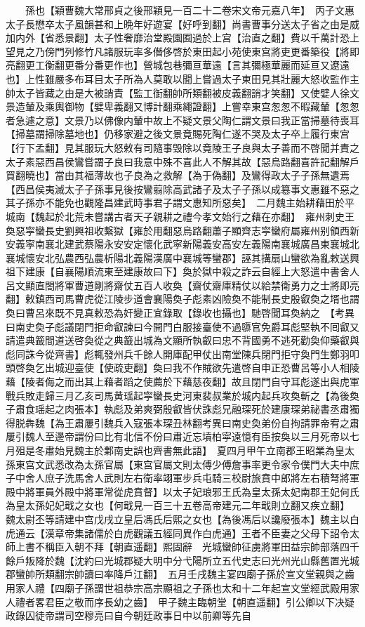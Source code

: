 　　孫也【穎曹魏大常邢貞之後邢穎見一百二十二卷宋文帝元嘉八年】　丙子文惠太子長懋卒太子風韻甚和上晩年好遊宴【好呼到翻】尚書曹事分送太子省之由是威加内外【省悉景翻】太子性奢靡治堂殿園囿過於上宫【治直之翻】費以千萬計恐上望見之乃傍門列修竹凡諸服玩率多僭侈啓於東田起小苑使東宫將吏更番築役【將即亮翻更工衡翻更番分番更作也】營城包巷彌亘華遠【言其彌極華麗而延亘又遼遠也】上性雖嚴多布耳目太子所為人莫敢以聞上嘗過太子東田見其壯麗大怒收監作主帥太子皆藏之由是大被誚責【監工衘翻帥所類翻被皮義翻誚才笑翻】又使嬖人徐文景造輦及乘輿御物【嬖卑義翻又博計翻乘繩證翻】上嘗幸東宫怱怱不暇藏輦【怱怱者急遽之意】文景乃以佛像内輦中故上不疑文景父陶仁謂文景曰我正當掃墓待喪耳【掃墓謂掃除墓地也】仍移家避之後文景竟賜死陶仁遂不哭及太子卒上履行東宫【行下孟翻】見其服玩大怒敕有司隨事毁除以竟陵王子良與太子善而不啓聞并責之太子素惡西昌侯鸞嘗謂子良曰我意中殊不喜此人不解其故【惡烏路翻喜許記翻解戶買翻曉也】當由其福薄故也子良為之救解【為于偽翻】及鸞得政太子子孫無遺焉【西昌侯夷滅太子子孫事見後按鸞翦除高武諸子及太子子孫以成簒事文惠雖不惡之其子孫亦不能免也觀隆昌建武時事君子謂文惠知所惡矣】　二月魏主始耕藉田於平城南【魏起於北荒未嘗講古者天子親耕之禮今孝文始行之藉在亦翻】　雍州刺史王奐惡寜蠻長史劉興祖收繫獄【雍於用翻惡烏路翻蕭子顯齊志寜蠻府屬雍州别領西新安義寜南襄北建武蔡陽永安安定懷化武寜新陽義安高安左義陽南襄城廣昌東襄城北襄城懷安北弘農西弘農析陽北義陽漢廣中襄城等蠻郡】誣其搆扇山蠻欲為亂敕送興祖下建康【自襄陽順流東至建康故曰下】奐於獄中殺之詐云自經上大怒遣中書舍人呂文顯直閤將軍曹道剛將齋仗五百人收奐【齋仗齋庫精仗以給禁衛勇力之士將即亮翻】敕鎮西司馬曹虎從江陵步道會襄陽奐子彪素凶險奐不能制長史殷叡奐之壻也謂奐曰曹呂來既不見真敕恐為奸變正宜錄取【錄收也攝也】馳啓聞耳奐納之　【考異曰南史奐子彪議閉門拒命叡諫曰今開門白服接臺使不過隳官免爵耳彪堅執不囘叡又請遣典籖間道送啓奐從之典籖出城為文顯所執叡曰忠不背國勇不逃死勸奐仰藥叡與彪同誅今從齊書】彪輒發州兵千餘人開庫配甲仗出南堂陳兵閉門拒守奐門生鄭羽叩頭啓奐乞出城迎臺使【使疏吏翻】奐曰我不作賊欲先遣啓自申正恐曹呂等小人相陵藉【陵者侮之而出其上藉者蹈之使薦於下藉慈夜翻】故且閉門自守耳彪遂出與虎軍戰兵敗走歸三月乙亥司馬黄瑶起寜蠻長史河東裴叔業於城内起兵攻奐斬之【為後奐子肅食瑶起之肉張本】執彪及弟爽弼殷叡皆伏誅彪兄融琛死於建康琛弟祕書丞肅獨得脱犇魏【為王肅屢引魏兵入寇張本琛丑林翻考異曰南史奐弟份自拘請罪帝宥之肅屢引魏人至邊帝謂份曰比有北信不份曰肅近忘墳柏寜遠憶有臣按奐以三月死帝以七月殂是冬肅始見魏主於鄴南史誤也齊書無此語】　夏四月甲午立南郡王昭業為皇太孫東宫文武悉改為太孫官屬【東宫官屬文則太傅少傅詹事率更令家令僕門大夫中庶子中舍人庶子洗馬舍人武則左右衛率翊軍步兵屯騎三校尉旅賁中郎將左右積弩將軍殿中將軍員外殿中將軍常從虎賁督】以太子妃琅邪王氏為皇太孫太妃南郡王妃何氏為皇太孫妃妃戢之女也【何戢見一百三十五卷高帝建元二年戢則立翻又疾立翻】　魏太尉丕等請建中宫戊戌立皇后馮氏后熙之女也【為後馮后以讒廢張本】魏主以白虎通云【漢章帝集諸儒於白虎觀議五經同異作白虎通】王者不臣妻之父母下詔令太師上書不稱臣入朝不拜【朝直遥翻】熙固辭　光城蠻帥征虜將軍田益宗帥部落四千餘戶叛降於魏【沈約曰光城郡疑大明中分弋陽所立五代史志曰光州光山縣舊置光城郡蠻帥所類翻宗帥讀曰率降戶江翻】　五月壬戌魏主宴四廟子孫於宣文堂親與之齒用家人禮【四廟子孫謂世祖恭宗高宗顯祖之子孫也太和十二年起宣文堂經武殿用家人禮者畧君臣之敬而序長幼之齒】　甲子魏主臨朝堂【朝直遥翻】引公卿以下决疑政錄囚徒帝謂司空穆亮曰自今朝廷政事日中以前卿等先自